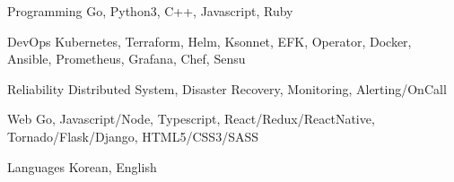 

\begin{cvskills}

  \cvskill
    {Programming} %
    {Go, Python3, C++, Javascript, Ruby} %

  \cvskill
    {DevOps} %
    {Kubernetes, Terraform, Helm, Ksonnet, EFK, Operator, Docker, Ansible, Prometheus, Grafana, Chef, Sensu} %

  \cvskill
    {Reliability} %
    {Distributed System, Disaster Recovery, Monitoring, Alerting/OnCall} %

  \cvskill
    {Web} %
    {Go, Javascript/Node, Typescript, React/Redux/ReactNative, Tornado/Flask/Django, HTML5/CSS3/SASS} %

  \cvskill
    {Languages} %
    {Korean, English} %

\end{cvskills}
